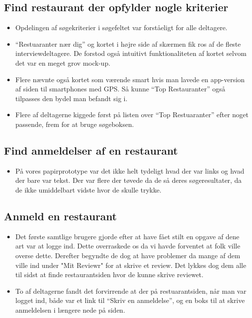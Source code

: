 \documentclass[a4paper, 12pt]{article}
\newcommand\pic[1]{\texttt{[image: ../oevelse6/Pics/\#1]}}
\newcommand\goodidea{\pic{goodidea}}
\newcommand\good{\pic{good}}
\newcommand\smallprob{\pic{smallproblem}}
\begin{document}
\subsection{Find restaurant der opfylder nogle kriterier}
\begin{itemize}
\item[\good] Opdelingen af søgekriterier i søgefeltet var forståeligt for alle deltagere.
\item[\good] ``Restuaranter nær dig'' og kortet i højre side af skærmen fik ros af de fleste interviewdeltagere. De forstod også intuitivt funktionaliteten af kortet selvom det var en meget grov mock-up.
\item[\goodidea] Flere nævnte også kortet som værende smart hvis man lavede en app-version af siden til smartphones med GPS. Så kunne ``Top Restauranter'' også tilpasses den bydel man befandt sig i.
\item[\smallprob] Flere af deltagerne kiggede først på listen over ``Top Restuaranter'' efter noget passende, frem for at bruge søgeboksen.
\end{itemize}

\subsection{Find anmeldelser af en restaurant}
\begin{itemize}
\item[\smallprob] På vores papirprototype var det ikke helt tydeligt hvad der var links og hvad der bare var tekst. Der var flere der tøvede da de så deres søgeresultater, da de ikke umiddelbart vidste hvor de skulle trykke.
\end{itemize}

\subsection{Anmeld en restaurant}
\begin{itemize}
\item[\smallprob] Det første samtlige brugere gjorde efter at have fået stilt en opgave af dene art
var at logge ind. Dette overraskede os da vi havde forventet at folk ville overse dette. Derefter begyndte de dog at have problemer da mange af dem ville ind under
"Mit Reviewr" for at skrive et review. Det lykkes dog dem alle til sidst at finde
restaurantsiden hvor de kunne skrive reviewet.
\item[\smallprob] To af deltagerne fandt det forvirrende at der på restuarantsiden, når man var logget ind, både var et link til ``Skriv en anmeldelse'', og en boks til at skrive anmeldelsen i længere nede på siden.  
\end{itemize}
\end{document}
